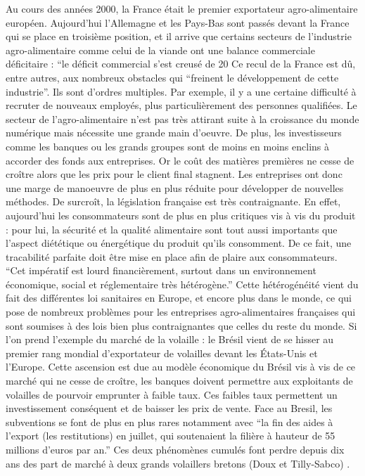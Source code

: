 \documentclass[a4paper,10pt]{report}
\begin{document}
			Au cours des années 2000, la France était le premier exportateur agro-alimentaire européen. Aujourd’hui l’Allemagne et les Pays-Bas sont passés devant la France qui se place en troisième position, et il arrive que certains secteurs de l’industrie agro-alimentaire comme celui de la viande ont une balance commerciale déficitaire : “le déficit commercial s'est creusé de 20%
			Ce recul de la France est dû, entre autres, aux nombreux obstacles qui “freinent le développement de cette industrie”. Ils sont d’ordres multiples. Par exemple, il y a une certaine difficulté à recruter de nouveaux employés, plus particulièrement des personnes qualifiées. Le secteur de l’agro-alimentaire n’est pas très attirant suite à la croissance du monde numérique mais nécessite une grande main d’oeuvre.
			De plus, les investisseurs comme les banques ou les grands groupes sont de moins en moins enclins à accorder des fonds aux entreprises. Or le coût des matières premières ne cesse de croître alors que les prix pour le client final stagnent. Les entreprises ont donc une marge de manoeuvre de plus en plus réduite pour développer de nouvelles méthodes. De surcroît, la législation française est très contraignante. En effet, aujourd’hui les consommateurs sont de plus en plus critiques vis à vis du produit : pour lui, la sécurité et la qualité alimentaire sont tout aussi importants que l’aspect diététique ou énergétique du produit qu’ils consomment. De ce fait, une tracabilité parfaite doit être mise en place afin de plaire aux consommateurs. “Cet impératif est lourd financièrement, surtout dans un environnement économique, social et réglementaire très hétérogène.” Cette hétérogénéité vient du fait des différentes loi sanitaires en Europe, et encore plus dans le monde, ce qui pose de nombreux problèmes pour les entreprises agro-alimentaires françaises qui sont soumises à des lois bien plus contraignantes que celles du reste du monde. Si l’on prend l’exemple du marché de la volaille : le Brésil vient de se hisser au premier rang mondial d’exportateur de volailles devant les États-Unis et l’Europe. Cette ascension est due au modèle économique du Brésil vis à vis de ce marché qui ne cesse de croître, les banques doivent permettre aux exploitants de volailles de pourvoir emprunter à faible taux. Ces faibles taux permettent un investissement conséquent et de baisser les prix de vente. Face au Bresil, les subventions se font de plus en plus rares notamment avec “la fin des aides à l'export (les restitutions) en juillet, qui soutenaient la filière à hauteur de 55 millions d'euros par an.” Ces deux phénomènes cumulés font perdre depuis dix ans des part de marché à deux grands volaillers bretons (Doux et Tilly-Sabco) .
			
\end{document}
